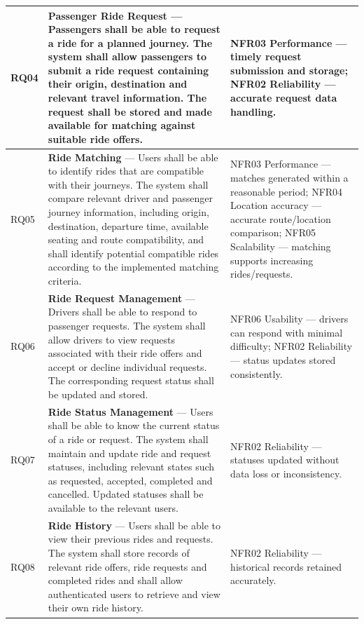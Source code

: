 \begin{longtable}{|>{\raggedright\arraybackslash}p{}
                   |>{\raggedright\arraybackslash}p{}
                   |>{\raggedright\arraybackslash}p{}|}
RQ04 & \textbf{Passenger Ride Request} --- Passengers shall be able to request a ride for a planned journey. The system shall allow passengers to submit a ride request containing their origin, destination and relevant travel information. The request shall be stored and made available for matching against suitable ride offers. & NFR03 Performance --- timely request submission and storage; \newline NFR02 Reliability --- accurate request data handling. \\
\hline

RQ05 & \textbf{Ride Matching} --- Users shall be able to identify rides that are compatible with their journeys. The system shall compare relevant driver and passenger journey information, including origin, destination, departure time, available seating and route compatibility, and shall identify potential compatible rides according to the implemented matching criteria. & NFR03 Performance --- matches generated within a reasonable period; \newline NFR04 Location accuracy --- accurate route/location comparison; \newline NFR05 Scalability --- matching supports increasing rides/requests. \\
\hline

RQ06 & \textbf{Ride Request Management} --- Drivers shall be able to respond to passenger requests. The system shall allow drivers to view requests associated with their ride offers and accept or decline individual requests. The corresponding request status shall be updated and stored. & NFR06 Usability --- drivers can respond with minimal difficulty; \newline NFR02 Reliability --- status updates stored consistently. \\
\hline

RQ07 & \textbf{Ride Status Management} --- Users shall be able to know the current status of a ride or request. The system shall maintain and update ride and request statuses, including relevant states such as requested, accepted, completed and cancelled. Updated statuses shall be available to the relevant users. & NFR02 Reliability --- statuses updated without data loss or inconsistency. \\
\hline

RQ08 & \textbf{Ride History} --- Users shall be able to view their previous rides and requests. The system shall store records of relevant ride offers, ride requests and completed rides and shall allow authenticated users to retrieve and view their own ride history. & NFR02 Reliability --- historical records retained accurately. \\
\hline


\end{longtable}

